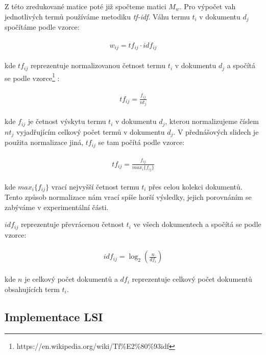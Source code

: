 \documentclass[11pt]{scrartcl} %
\begin{document}
\bigskip

Z této zredukované matice poté již spočteme matici $M_w$. Pro výpočet vah jednotlivých termů používáme metodiku \emph{tf-idf}. Váhu termu $t_i$ v dokumentu $d_j$ spočítáme podle vzorce:

\begin{align}
	\begin{split}
		w_{ij} = tf_{ij} \cdot idf_{ij}
	\end{split}					
\end{align}

kde $tf_{ij}$ reprezentuje normalizovanou četnost termu $t_i$ v dokumentu $d_j$ a spočítá se podle vzorce\footnote{https://en.wikipedia.org/wiki/Tf\%E2\%80\%93idf} :

\begin{align}
	\begin{split}
		tf_{ij} = \frac{f_{ij}}{nt_j}
	\end{split}					
\end{align}

kde $f_{ij}$ je četnost výskytu termu $t_i$ v dokumentu $d_j$, kterou normalizujeme číslem $nt_j$ vyjadřujícím celkový počet termů v dokumentu $d_j$. V přednášových slidech je použita normalizace jiná, $tf_{ij}$ se tam počítá podle vzorce:

\begin{align}
	\begin{split}
		tf_{ij} = \frac{f_{ij}}{max_i\{f_{ij}\}}
	\end{split}					
\end{align}

kde $max_i\{f_{ij}\}$ vrací nejvyšší četnost termu $t_i$ přes celou kolekci dokumentů. Tento způsob normalizace nám vrací spíše horší výsledky, jejich porovnáním se zabýváme v experimentální části.

$idf_{ij}$ reprezentuje převrácenou četnost $t_i$ ve všech dokumentech a spočítá se podle vzorce:

\begin{align}
	\begin{split}
		idf_{ij} = \log_2 (\frac{n}{df_i})
	\end{split}					
\end{align}

kde $n$ je celkový počet dokumentů a $df_i$ reprezentuje celkový počet dokumentů obsahujících term $t_i$.

\subsection{Implementace LSI}
\end{document}
